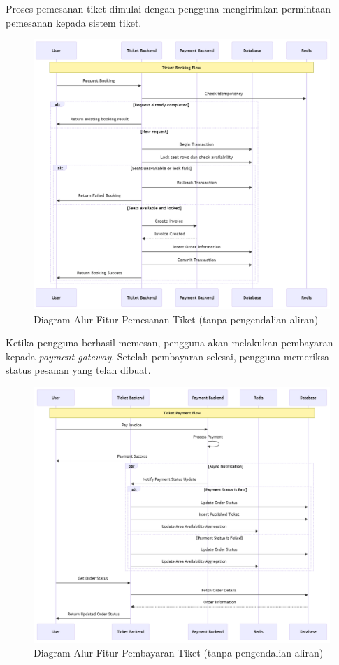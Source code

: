 Proses pemesanan tiket dimulai dengan pengguna mengirimkan permintaan pemesanan kepada sistem tiket.

\begin{figure}[h]
    \centering
    \includegraphics[width=1\textwidth]{resources/chapter-3/book-flow.png}
    \caption{Diagram Alur Fitur Pemesanan Tiket (tanpa pengendalian aliran)}
    \label{fig:flow-book-flow}
\end{figure}

\pagebreak

Ketika pengguna berhasil memesan, pengguna akan melakukan pembayaran kepada \textit{payment gateway}. Setelah pembayaran selesai, pengguna memeriksa status pesanan yang telah dibuat.

\begin{figure}[h]
    \centering
    \includegraphics[width=1\textwidth]{resources/chapter-3/order-payment.png}
    \caption{Diagram Alur Fitur Pembayaran Tiket (tanpa pengendalian aliran)}
    \label{fig:flow-order-payment-flow}
\end{figure}

